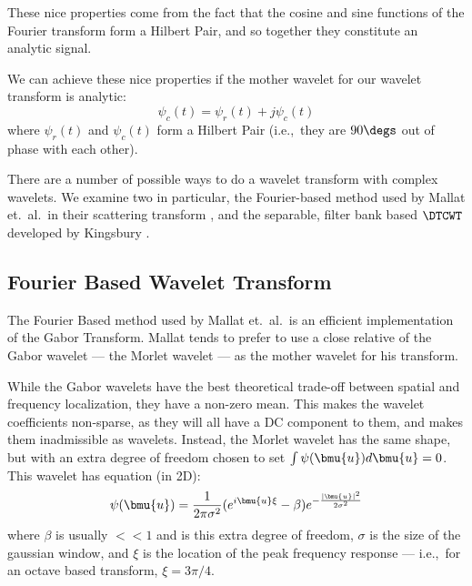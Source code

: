   These nice properties come from the fact that the cosine and sine functions of the
  Fourier transform form a Hilbert Pair, and so together they constitute an 
  analytic signal.

  We can achieve these nice properties if the mother wavelet for our wavelet
  transform is analytic:
  \begin{equation}
    \psi_{c}(t) = \psi_{r}(t) + j\psi_{c}(t) \label{eq:ch2:complex_wavelet}
  \end{equation}
  where $\psi_{r}(t)$ and $\psi_{c}(t)$ form a Hilbert Pair (i.e.,\ they are
  $90\degs$ out of phase with each other).

  There are a number of possible ways to do a wavelet transform with complex
  wavelets. We examine two in particular, the Fourier-based method used by
  Mallat et.\ al.\ in their scattering transform
  \citep{bruna_classification_2011, bruna_invariant_2013, bruna_scattering_2013,
  oyallon_generic_2013, oyallon_deep_2015, sifre_rotation_2013,
  sifre_rigid-motion_2014, sifre_rigid-motion_2014-1, sifre_scatnet_2013}, and
  the separable, filter bank based $\DTCWT$ developed by Kingsbury
  \citep{kingsbury_wavelet_1997, kingsbury_dual-tree_1998,
  kingsbury_dual-tree_1998-1,  kingsbury_image_1999, kingsbury_shift_1999,
  kingsbury_dual-tree_2000, kingsbury_complex_2001, selesnick_dual-tree_2005}.

\subsection{Fourier Based Wavelet Transform}\label{sec:ch2:morlet_fourier}
  The Fourier Based method used by Mallat et.\ al.\ is an efficient
  implementation of the Gabor Transform. Mallat tends to prefer to use a close
  relative of the Gabor wavelet --- the Morlet wavelet --- as the mother wavelet
  for his transform. 
  
  While the Gabor wavelets have the best theoretical trade-off between spatial
  and frequency localization, they have a non-zero mean.  This makes the
  wavelet coefficients non-sparse, as they will all have a DC component to
  them, and makes them inadmissible as wavelets. Instead, the Morlet wavelet
  has the same shape, but with an extra degree of freedom chosen to set $\int
  \psi (\bmu{u}) d\bmu{u} =0$.  This wavelet has equation (in 2D):
  \begin{equation}
    \psi(\bmu{u}) = \frac{1}{2\pi\sigma^2} {(e^{i\bmu{u}\xi} - \beta)}
                     e^{-\frac{|\bmu{u}|^2}{2\sigma^2}} 
    \label{eq:ch2:morlet}
  \end{equation}
  where $\beta$ is usually $<<1$ and is this extra degree of freedom, 
  $\sigma$ is the size of the gaussian window, and $\xi$ is the
  location of the peak frequency response --- i.e.,\ for an octave based
  transform, $\xi = 3\pi/4$.

